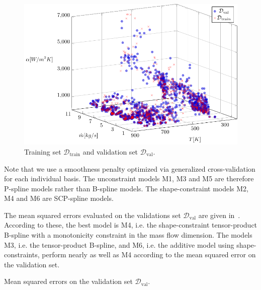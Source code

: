 \begin{figure}[H]
	\centering
	\includegraphics[width=\columnwidth]{graphics/pgfplots/cha5/train-val-split.pdf}
	\caption{Training set $\mathcal{D}_{\text{train}}$ and validation set $\mathcal{D}_{\text{val}}$.}
	\label{fig:ebner-train-val-split}
\end{figure}
%
Note that we use a smoothness penalty optimized via generalized cross-validation for each individual basis. The unconstraint models M1, M3 and M5 are therefore P-spline models rather than B-spline models. The shape-constraint models M2, M4 and M6 are SCP-spline models. 

The mean squared errors evaluated on the validations set $\mathcal{D}_{\text{val}}$ are given in~. According to these, the best model is M4, i.e. the shape-constraint tensor-product B-spline with a monotonicity constraint in the mass flow dimension. The models M3, i.e. the tensor-product B-spline, and M6, i.e. the additive model using shape-constraints, perform nearly as well as M4 according to the mean squared error on the validation set. 

\begin{table}[H]
	\begin{center}
	\end{center}
	\caption{Mean squared errors on the validation set $\mathcal{D}_{\text{val}}$.}
	\label{tab:ebner-mse-val}
\end{table}

